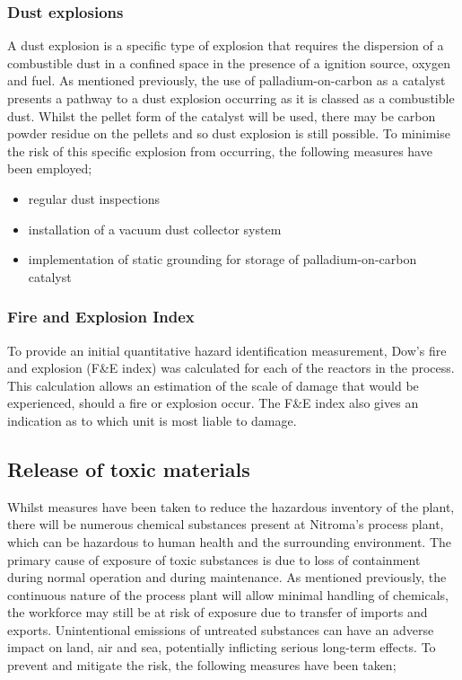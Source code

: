 \subsubsection{Dust explosions}

A dust explosion is a specific type of explosion that requires the dispersion of a combustible dust in a confined space in the presence of a ignition source, oxygen and fuel. As mentioned previously, the use of palladium-on-carbon as a catalyst presents a pathway to a dust explosion occurring as it is classed as a combustible dust. Whilst the pellet form of the catalyst will be used, there may be carbon powder residue on the pellets and so dust explosion is still possible. To minimise the risk of this specific explosion from occurring, the following measures have been employed;

\begin{itemize}
    \item regular dust inspections 
    \item installation of a vacuum dust collector system 
    \item implementation of static grounding for storage of palladium-on-carbon catalyst  
\end{itemize}


\subsubsection{Fire and Explosion Index}

To provide an initial quantitative hazard identification measurement, Dow's fire and explosion (F\&E index) was calculated for each of the reactors in the process. This calculation allows an estimation of the scale of damage that would be experienced, should a fire or explosion occur. The F\&E index also gives an indication as to which unit is most liable to damage. 


\subsection{Release of toxic materials}

Whilst measures have been taken to reduce the hazardous inventory of the plant, there will be numerous chemical substances present at Nitroma's process plant, which can be hazardous to human health and the surrounding environment. The primary cause of exposure of toxic substances is due to loss of containment during normal operation and during maintenance. As mentioned previously, the continuous nature of the process plant will allow minimal handling of chemicals, the workforce may still be at risk of exposure due to transfer of imports and exports. Unintentional emissions of untreated substances can have an adverse impact on land, air and sea, potentially inflicting serious long-term effects. To prevent and mitigate the risk, the following measures have been taken;


